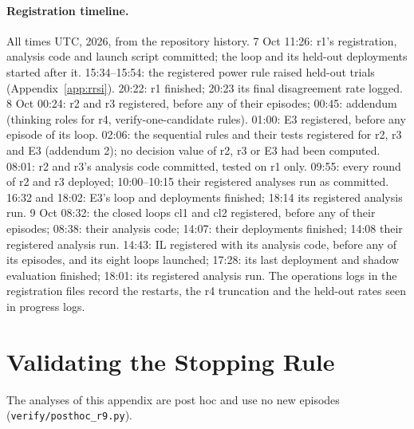\documentclass[11pt]{article}
\begin{document}
\paragraph{Registration timeline.} All times UTC, 2026, from the repository history. 7 Oct 11:26: r1's registration, analysis code and launch script committed; the loop and its held-out deployments started after it. 15:34--15:54: the registered power rule raised held-out trials (Appendix~\ref{app:rrsi}). 20:22: r1 finished; 20:23 its final disagreement rate logged. 8 Oct 00:24: r2 and r3 registered, before any of their episodes; 00:45: addendum (thinking roles for r4, verify-one-candidate rules). 01:00: E3 registered, before any episode of its loop. 02:06: the sequential rules and their tests registered for r2, r3 and E3 (addendum 2); no decision value of r2, r3 or E3 had been computed. 08:01: r2 and r3's analysis code committed, tested on r1 only. 09:55: every round of r2 and r3 deployed; 10:00--10:15 their registered analyses run as committed. 16:32 and 18:02: E3's loop and deployments finished; 18:14 its registered analysis run. 9 Oct 08:32: the closed loops cl1 and cl2 registered, before any of their episodes; 08:38: their analysis code; 14:07: their deployments finished; 14:08 their registered analysis run. 14:43: IL registered with its analysis code, before any of its episodes, and its eight loops launched; 17:28: its last deployment and shadow evaluation finished; 18:01: its registered analysis run. The operations logs in the registration files record the restarts, the r4 truncation and the held-out rates seen in progress logs.

\section{Validating the Stopping Rule}
\label{app:r9}

The analyses of this appendix are post hoc and use no new episodes (\texttt{verify/posthoc\_r9.py}).
\end{document}
